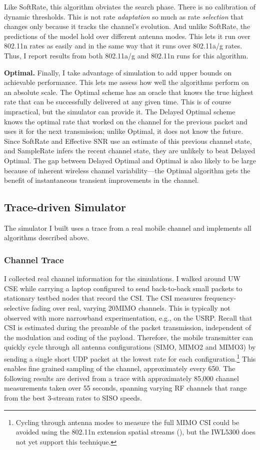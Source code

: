 Like SoftRate, this algorithm obviates the search phase. There is no calibration of dynamic thresholds. This is not rate \emph{adaptation} so much as rate \emph{selection} that changes only because it tracks the channel's evolution. And unlike SoftRate, the predictions of the model hold over different antenna modes. This lets it run over 802.11n rates as easily and in the same way that it runs over 802.11a/g rates. Thus, I report results from both 802.11a/g and 802.11n runs for this algorithm.

\textbf{Optimal.} Finally, I take advantage of simulation to add upper bounds on achievable performance. This lets me assess how well the algorithms perform on an absolute scale. The Optimal scheme has an oracle that knows the true highest rate that can be successfully delivered at any given time. This is of course impractical, but the simulator can provide it. The Delayed Optimal scheme knows the optimal rate that worked on the channel for the previous packet and uses it for the next transmission; unlike Optimal, it does not know the future. Since SoftRate and Effective SNR use an estimate of this previous channel state, and SampleRate infers the recent channel state, they are unlikely to beat Delayed Optimal. The gap between Delayed Optimal and Optimal is also likely to be large because of inherent wireless channel variability---the Optimal algorithm gets the benefit of instantaneous transient improvements in the channel.

\subsection{Trace-driven Simulator}

The simulator I built uses a trace from a real mobile channel and implements all algorithms described above.

\subsubsection{Channel Trace}
I collected real channel information for the simulations. I walked around UW CSE while carrying a laptop configured to send back-to-back small packets to stationary testbed nodes that record the CSI. The CSI measures frequency-selective fading over real, varying 20\MHz MIMO channels. This is typically not observed with more narrowband experimentation, e.g., on the USRP. Recall that CSI is estimated during the preamble of the packet transmission, independent of the modulation and coding of the payload. Therefore, the mobile transmitter can quickly cycle through all antenna configurations (SIMO, MIMO2 and MIMO3) by sending a single short UDP packet at the lowest rate for each configuration.\footnote{Cycling through antenna modes to measure the full MIMO CSI could be avoided using the 802.11n extension spatial streams (), but the IWL5300 does not yet support this technique.} This enables fine grained sampling of the channel, approximately every 650\us. The following results are derived from a trace with approximately 85,000 channel measurements taken over 55 seconds, spanning varying RF channels that range from the best 3-stream rates to SISO speeds.

